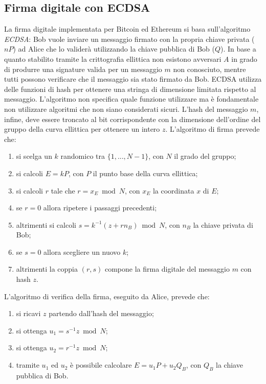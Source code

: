 \subsection{Firma digitale con ECDSA}
La firma digitale implementata per Bitcoin ed Ethereum si basa sull'algoritmo \textit{ECDSA}: Bob vuole inviare un messaggio firmato con la propria chiave privata ($nP$) ad Alice che lo validerà utilizzando la chiave pubblica di Bob ($Q$).\newline
In base a quanto stabilito tramite la crittografia ellittica non esistono avversari $A$ in grado di produrre una signature valida per un messaggio $m$ non conosciuto, mentre tutti possono verificare che il messaggio sia stato firmato da Bob.\newline\newline
ECDSA utilizza delle funzioni di hash per ottenere una stringa di dimensione limitata rispetto al messaggio. L'algoritmo non specifica quale funzione utilizzare ma è fondamentale non utilizzare algoritmi che non siano considerati sicuri.\newline
L'hash del messaggio $m$, infine, deve essere troncato al bit corrispondente con la dimensione dell'ordine del gruppo della curva ellittica per ottenere un intero $z$. L'algoritmo di firma prevede che:
\begin{enumerate}
    \item si scelga un $k$ randomico tra $\{1,...,N-1\}$, con $N$ il grado del gruppo;
    \item si calcoli $E=kP$, con $P$ il punto base della curva ellittica;
    \item si calcoli $r$ tale che $r=x_E \bmod N$, con $x_E$ la coordinata $x$ di $E$;
    \item se $r=0$ allora ripetere i passaggi precedenti;
    \item altrimenti si calcoli $s=k^{-1}(z+rn_B)\bmod N$, con $n_B$ la chiave privata di Bob;
    \item se $s=0$ allora scegliere un nuovo $k$;
    \item altrimenti la coppia $(r,s)$ compone la firma digitale del messaggio $m$ con hash $z$.
\end{enumerate}
L'algoritmo di verifica della firma, eseguito da Alice, prevede che:
\begin{enumerate}
    \item si ricavi $z$ partendo dall'hash del messaggio;
    \item si ottenga $u_1=s^{-1}z\bmod N$;
    \item si ottenga $u_2=r^{-1}z\bmod N$;
    \item tramite $u_1$ ed $u_2$ è possibile calcolare $E=u_1P+u_2Q_B$, con $Q_B$ la chiave pubblica di Bob.
\end{enumerate}
